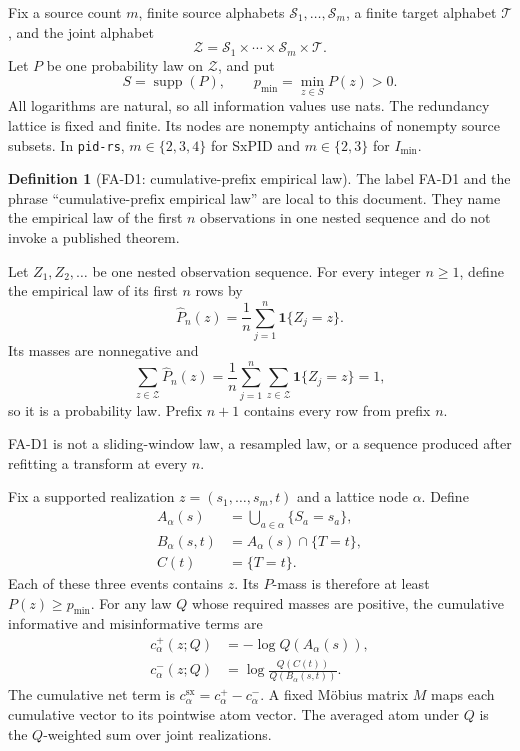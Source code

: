 \documentclass[11pt]{article}
\theoremstyle{definition}
\newtheorem{definition}[theorem]{Definition}
\newcommand{\cZ}{\mathcal{Z}}
\newcommand{\cS}{\mathcal{S}}
\newcommand{\cT}{\mathcal{T}}
\newcommand{\supp}{\operatorname{supp}}
\newcommand{\Phat}{\widehat{P}}
\newcommand{\Ind}{\mathbf{1}}
\newcommand{\sx}{\mathrm{sx}}
\newcommand{\imin}{I_{\min}}
\begin{document}
Fix a source count $m$, finite source alphabets $\cS_1,\ldots,\cS_m$, a finite target alphabet
$\cT$, and the joint alphabet
\begin{equation}
  \cZ=\cS_1\times\cdots\times\cS_m\times\cT.
\end{equation}
Let $P$ be one probability law on $\cZ$, and put
\begin{equation}
  S=\supp(P),
  \qquad
  p_{\min}=\min_{z\in S}P(z)>0.
\end{equation}
All logarithms are natural, so all information values use nats.  The redundancy lattice is fixed
and finite.  Its nodes are nonempty antichains of nonempty source subsets.  In \texttt{pid-rs},
$m\in\{2,3,4\}$ for SxPID and $m\in\{2,3\}$ for $\imin$.

\begin{definition}[FA-D1: cumulative-prefix empirical law]\label{def:fa-prefix}
The label FA-D1 and the phrase ``cumulative-prefix empirical law'' are local to this document.
They name the empirical law of the first $n$ observations in one nested sequence and do not invoke
a published theorem.

Let $Z_1,Z_2,\ldots$ be one nested observation sequence.  For every integer $n\ge1$, define the
empirical law of its first $n$ rows by
\begin{equation}
  \Phat_n(z)=\frac{1}{n}\sum_{j=1}^{n}\Ind\{Z_j=z\}.
\end{equation}
Its masses are nonnegative and
\begin{equation}
  \sum_{z\in\cZ}\Phat_n(z)
  =\frac1n\sum_{j=1}^n\sum_{z\in\cZ}\Ind\{Z_j=z\}=1,
\end{equation}
so it is a probability law.  Prefix $n+1$ contains every row from prefix $n$.
\end{definition}

FA-D1 is not a sliding-window law, a resampled law, or a sequence produced after refitting a
transform at every $n$.

Fix a supported realization $z=(s_1,\ldots,s_m,t)$ and a lattice node $\alpha$.  Define
\begin{align}
  A_\alpha(s)
    &=\bigcup_{a\in\alpha}\{S_a=s_a\}, \\
  B_\alpha(s,t)
    &=A_\alpha(s)\cap\{T=t\}, \\
  C(t)
    &=\{T=t\}.
\end{align}
Each of these three events contains $z$.  Its $P$-mass is therefore at least
$P(z)\ge p_{\min}$.  For any law $Q$
whose required masses are positive, the cumulative informative and misinformative terms are
\begin{align}
  c^+_\alpha(z;Q)
    &=-\log Q(A_\alpha(s)), \\
  c^-_\alpha(z;Q)
    &=\log\frac{Q(C(t))}{Q(B_\alpha(s,t))}.
\end{align}
The cumulative net term is $c^\sx_\alpha=c^+_\alpha-c^-_\alpha$.  A fixed M{\"o}bius matrix $M$ maps
each cumulative vector to its pointwise atom vector.  The averaged atom under $Q$ is the
$Q$-weighted sum over joint realizations.
\end{document}
